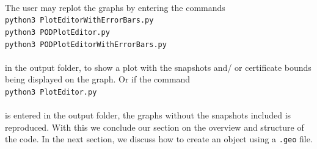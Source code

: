 \\
The user may replot the graphs by entering the commands\\

\noindent \texttt{python3 PlotEditorWithErrorBars.py}\\
\noindent \texttt{python3 PODPlotEditor.py}\\
\noindent \texttt{python3 PODPlotEditorWithErrorBars.py}\\
\\
in the output folder, to show a plot with the snapshots and/ or certificate bounds being displayed on the graph.  Or if the command\\

\noindent \texttt{python3 PlotEditor.py}\\
\\
is entered in the output folder, the graphs without the snapshots included is reproduced. With this we conclude our section on the overview and structure of the code. In the next section, we discuss how to create an object using a \texttt{.geo} file.\\





















